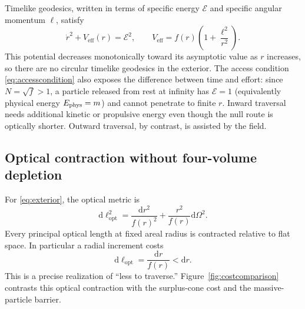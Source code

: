 \documentclass[aps,prd,twocolumn,amsmath,amssymb,nofootinbib]{revtex4-2}
\newcommand{\dd}{\mathrm{d}}
\newcommand{\eff}{\mathrm{eff}}
\newcommand{\opt}{\mathrm{opt}}
\begin{document}
Timelike geodesics, written in terms of specific energy $\mathcal E$ and
specific angular momentum $\ell$, satisfy
\begin{equation}
 \dot r^2+V_{\eff}(r)=\mathcal E^2,
 \qquad
 V_{\eff}=f(r)\left(1+\frac{\ell^2}{r^2}\right).
 \label{eq:timelikepotential}
\end{equation}
This potential decreases monotonically toward its asymptotic value as $r$
increases, so there are no circular timelike geodesics in the exterior.  The
access condition \eqref{eq:accesscondition} also exposes the difference
between time and effort: since $N=\sqrt f>1$, a particle released from rest at
infinity has $\mathcal E=1$ (equivalently physical energy $E_{\rm phys}=m$)
and cannot penetrate to finite $r$.  Inward traversal needs
additional kinetic or propulsive energy even though the null route is
optically shorter.  Outward traversal, by contrast, is assisted by the field.

\subsection{Optical contraction without four-volume depletion}

For \eqref{eq:exterior}, the optical metric is
\begin{equation}
 \dd\ell_{\opt}^2
 =\frac{\dd r^2}{f(r)^2}
 +\frac{r^2}{f(r)}\dd\Omega^2.
 \label{eq:negativeoptical}
\end{equation}
Every principal optical length at fixed areal radius is contracted relative
to flat space.  In particular a radial increment costs
\begin{equation}
 \dd\ell_{\opt}=\frac{\dd r}{f(r)}<\dd r.
 \label{eq:radialcost}
\end{equation}
This is a precise realization of ``less to traverse.''
Figure~\ref{fig:costcomparison} contrasts this optical contraction with the
surplus-cone cost and the massive-particle barrier.
\end{document}
